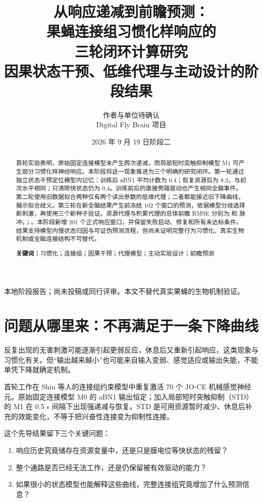 \documentclass[UTF8,a4paper,zihao=-4,fontset=none]{ctexart}
\title{\bfseries 从响应递减到前瞻预测：\\果蝇连接组习惯化样响应的\\三轮闭环计算研究\\[0.5em]\large 因果状态干预、低维代理与主动设计的阶段结果}
\author{作者与单位待确认\\\small Digital Fly Brain 项目}
\date{2026 年 9 月 19 日\quad 阶段二}
\begin{document}
\maketitle\thispagestyle{fancy}
\begin{center}\small 本地阶段报告；尚未投稿或同行评审。本文不替代真实果蝇的生物机制验证。\end{center}
\begin{abstract}
首轮实验表明，原始固定连接模型未产生跨次递减，而局部短时突触抑制模型 M1 可产生部分习惯化样神经响应。本阶段将这一现象推进为三个明确的研究闭环。第一轮通过独立状态干预定位模型内记忆：训练后 aBN1 平均计数为 0.4；恢复资源后为 8.2，与初次水平相同；只清除快状态仍为 0.4。训练前后的直接旁路驱动也产生相同全脑事件。第二轮使用旧数据拟合两种仅有两个读出参数的低维代理；二者都能接近旧下降曲线，揭示拟合歧义。第三轮在新全脑结果产生前冻结 102 个窗口的预测，依据模型分歧选择新刺激，再使用三个新种子验证。资源代理与积累代理的总体前瞻 RMSE 分别为 \ResourceProspectiveRMSE{} 和 \AccumulatorProspectiveRMSE{} 脉冲。\RelativeVerdict{}；\AbsoluteVerdict{}。本阶段新增 201 个正式响应窗口，并保留失败启动、修复和所有未达标条件。结果支持模型内慢状态归因与可证伪预测流程，但尚未证明完整行为习惯化、真实生物机制或全脑连接结构不可替代。

\medskip\noindent\textbf{关键词：}习惯化；连接组；因果干预；代理模型；主动实验设计；前瞻预测
\end{abstract}

\section{问题从哪里来：不再满足于一条下降曲线}
反复出现的无害刺激可能逐渐引起更弱反应，休息后又重新引起响应，这类现象与习惯化有关。但“输出越来越小”也可能来自输入变弱、感觉适应或输出失能，不能单凭下降就确定机制\citep{rankin2009}。

首轮工作在 Shiu 等人的连接组约束模型\citep{shiu2024}中重复激活 70 个 JO-CE 机械感觉神经元。原始固定连接模型 M0 的 aBN1 输出恒定；加入局部短时突触抑制（STD）的 M1 在 0.5 s 间隔下出现强递减与恢复。STD 是可用资源暂时减少、休息后补充的效能变化，不等于把兴奋性连接变为抑制性连接。

这个先导结果留下三个关键问题：
\begin{enumerate}
\item 响应历史究竟储存在资源变量中，还是只是膜电位等快状态的残留？
\item 整个通路是否已经无法工作，还是仍保留被有效驱动的能力？
\item 如果很小的状态模型也能解释这些曲线，完整连接组究竟增加了什么预测信息？
\end{enumerate}
\end{document}
